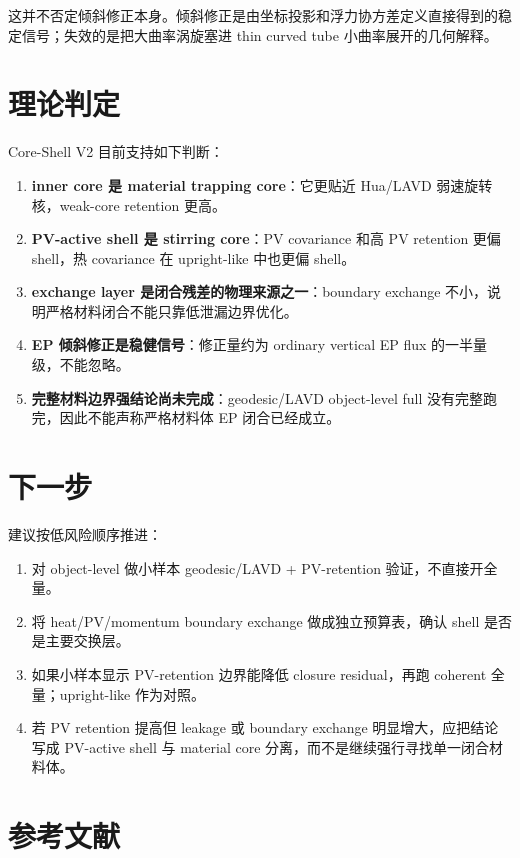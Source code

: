 \documentclass[UTF8,12pt]{ctexart}
\begin{document}
这并不否定倾斜修正本身。倾斜修正是由坐标投影和浮力协方差定义直接得到的稳定信号；失效的是把大曲率涡旋塞进 thin curved tube 小曲率展开的几何解释。

\section{理论判定}

Core-Shell V2 目前支持如下判断：
\begin{enumerate}
  \item \textbf{inner core 是 material trapping core}：它更贴近 Hua/LAVD 弱速旋转核，weak-core retention 更高。
  \item \textbf{PV-active shell 是 stirring core}：PV covariance 和高 PV retention 更偏 shell，热 covariance 在 upright-like 中也更偏 shell。
  \item \textbf{exchange layer 是闭合残差的物理来源之一}：boundary exchange 不小，说明严格材料闭合不能只靠低泄漏边界优化。
  \item \textbf{EP 倾斜修正是稳健信号}：修正量约为 ordinary vertical EP flux 的一半量级，不能忽略。
  \item \textbf{完整材料边界强结论尚未完成}：geodesic/LAVD object-level full 没有完整跑完，因此不能声称严格材料体 EP 闭合已经成立。
\end{enumerate}

\section{下一步}

建议按低风险顺序推进：
\begin{enumerate}
  \item 对 object-level 做小样本 geodesic/LAVD + PV-retention 验证，不直接开全量。
  \item 将 heat/PV/momentum boundary exchange 做成独立预算表，确认 shell 是否是主要交换层。
  \item 如果小样本显示 PV-retention 边界能降低 closure residual，再跑 coherent 全量；upright-like 作为对照。
  \item 若 PV retention 提高但 leakage 或 boundary exchange 明显增大，应把结论写成 PV-active shell 与 material core 分离，而不是继续强行寻找单一闭合材料体。
\end{enumerate}

\section{参考文献}
\end{document}
